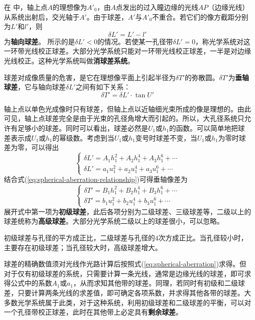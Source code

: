 在 中，轴上点$A$的理想像为$A'_0$，由$A$点发出的过入瞳边缘的光线$AP$（边缘光线）从系统出射后，交光轴于$A'$。由于球差，$A'$与$A'_0$不重合。若它们的像方截距分别为$L'$和$l'$，则
\begin{equation}
\delta L'=L'-l'
\label{eq:spherical-aberration}
\end{equation}
为\textbf{轴向球差}。 所示的是$\delta L'<0$的情况。若使某一孔径带$\delta L'=0$，称光学系统对这一环带光线校正球差。大部分光学系统只能对一环带光线校正球差，一半是对边缘光线校正。这种光学系统叫做\textbf{消球差系统}。

球差对成像质量的危害，是它在理想像平面上引起半径为$\delta T'$的弥散圆。$\delta T'$为\textbf{垂轴球差}，它与轴向球差$\delta L'$之间有如下关系：
\begin{equation}
\delta T'=\delta L'\cdot\tan U'
\label{eq:spherical-aberration-relationship}
\end{equation}

轴上点以单色光成像时只有球差，但轴上点以近轴细光束所成的像是理想的。由此可见，轴上点球差完全是由于光束的孔径角增大而引起的。所以，大孔径系统只允许有足够小的球差。同时可以看出，球差必然是$U_1$或$h_1$的函数。可以简单地把球差表示成$U_1$或$h_1$的幂级数。考虑到当$U_1$或$h_1$变号时球差不变，当$U_1$或$h_1$为零时球差为零，可以得出
\begin{equation}
\begin{cases}
\delta L'=A_1h^2_1+A_2h^4_1+A_3h^6_1+\cdots\\
\delta L'=a_1u^2_1+a_2u^4_1+a_3u^6_1+\cdots
\end{cases}
\end{equation}
结合式(\ref{eq:spherical-aberration-relationship})可得垂轴像差为
\begin{equation}
\begin{cases}
\delta T'=B_1h^2_1+B_2h^4_1+B_3h^6_1+\cdots\\
\delta T'=b_1u^2_1+b_2u^4_1+b_3u^6_1+\cdots
\end{cases}
\end{equation}
展开式中第一项为\textbf{初级球差}，此后各项分别为二级球差、三级球差等，二级以上的球差统称为\textbf{高级球差}。大部分光学系统二级以上的球差很小，可以忽略。
\begin{property}
	初级球差与孔径的平方成正比，二级球差与孔径的$4$次方成正比。当孔径较小时，主要存在初级球差；当孔径较大时，高级球差增大。	
\end{property}

球差的精确数值须对光线作光路计算后按照式(\ref{eq:spherical-aberration})求得。但对于仅有初级球差的系统，只需要计算一条光线，通常是边缘光线的球差，即可求得公式中的系数$A_1$或$a_1$，从而求知其他带的球差。同理，若同时有初级和二级球差，只要计算两条光线的求差值，即可确定各项系数，并求得其他各带的球差。大多数光学系统属于此类，对于这种系统，利用初级球差和二级球差的平衡，可以对一个孔径带校正球差，此时在其他带上必定具有\textbf{剩余球差}。

